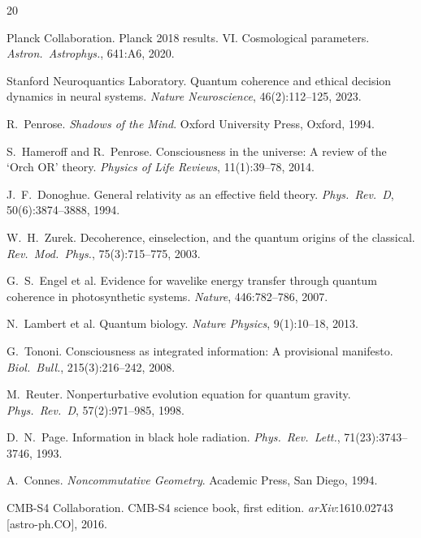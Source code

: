 \documentclass[12pt,a4paper]{article}
\theoremstyle{myrmk}
\begin{document}
\begin{thebibliography}{20}

Planck Collaboration.
\newblock Planck 2018 results. {VI}. Cosmological parameters.
\newblock \textit{Astron.\ Astrophys.}, 641:A6, 2020.

Stanford Neuroquantics Laboratory.
\newblock Quantum coherence and ethical decision dynamics in neural systems.
\newblock \textit{Nature Neuroscience}, 46(2):112--125, 2023.

R.\ Penrose.
\newblock \textit{Shadows of the Mind}.
\newblock Oxford University Press, Oxford, 1994.

S.\ Hameroff and R.\ Penrose.
\newblock Consciousness in the universe: A review of the `Orch OR' theory.
\newblock \textit{Physics of Life Reviews}, 11(1):39--78, 2014.

J.\ F.\ Donoghue.
\newblock General relativity as an effective field theory.
\newblock \textit{Phys.\ Rev.\ D}, 50(6):3874--3888, 1994.

W.\ H.\ Zurek.
\newblock Decoherence, einselection, and the quantum origins of the classical.
\newblock \textit{Rev.\ Mod.\ Phys.}, 75(3):715--775, 2003.

G.\ S.\ Engel et al.
\newblock Evidence for wavelike energy transfer through quantum coherence in photosynthetic systems.
\newblock \textit{Nature}, 446:782--786, 2007.

N.\ Lambert et al.
\newblock Quantum biology.
\newblock \textit{Nature Physics}, 9(1):10--18, 2013.

G.\ Tononi.
\newblock Consciousness as integrated information: A provisional manifesto.
\newblock \textit{Biol.\ Bull.}, 215(3):216--242, 2008.

M.\ Reuter.
\newblock Nonperturbative evolution equation for quantum gravity.
\newblock \textit{Phys.\ Rev.\ D}, 57(2):971--985, 1998.

D.\ N.\ Page.
\newblock Information in black hole radiation.
\newblock \textit{Phys.\ Rev.\ Lett.}, 71(23):3743--3746, 1993.

A.\ Connes.
\newblock \textit{Noncommutative Geometry}.
\newblock Academic Press, San Diego, 1994.

CMB-S4 Collaboration.
\newblock CMB-S4 science book, first edition.
\newblock \textit{arXiv}:1610.02743 [astro-ph.CO], 2016.

\end{thebibliography}
\end{document}
